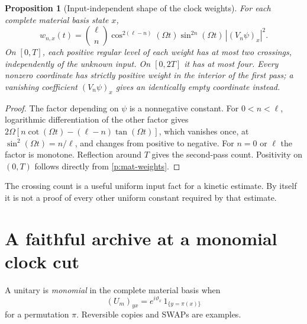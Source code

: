 \documentclass[11pt,oneside,openany]{book}
\newtheorem{proposition}[theorem]{Proposition}
\theoremstyle{definition}
\theoremstyle{remark}\newtheorem{remark}[theorem]{Remark}
\begin{document}
\begin{proposition}[Input-independent shape of the clock weights]
\label{p:mat-levels}
For each complete material basis state $x$,
\begin{equation}\label{p:mat-weights}
 w_{n,x}(t)=\binom\ell n\cos^{2(\ell-n)}(\Omega t)
             \sin^{2n}(\Omega t)\,|(V_n\psi)_x|^2.
\end{equation}
On $[0,T]$, each positive regular level of each weight has at most two
crossings, independently of the unknown input.  On $[0,2T]$ it has at
most four.  Every nonzero coordinate has strictly positive weight in
the interior of the first pass; a vanishing coefficient
$(V_n\psi)_x$ gives an identically empty coordinate instead.
\end{proposition}
\begin{proof}
The factor depending on $\psi$ is a nonnegative constant.  For
$0<n<\ell$, logarithmic differentiation of the other factor gives
$2\Omega[n\cot(\Omega t)-(\ell-n)\tan(\Omega t)]$, which vanishes
once, at $\sin^2(\Omega t)=n/\ell$, and changes from positive to
negative.  For $n=0$ or $\ell$ the factor is monotone.  Reflection
around $T$ gives the second-pass count.  Positivity on $(0,T)$ follows
directly from \eqref{p:mat-weights}.
\end{proof}
The crossing count is a useful uniform input fact for a kinetic estimate.
By itself it is not a proof of every other uniform constant required by
that estimate.

\section{A faithful archive at a monomial clock cut}

A unitary is \emph{monomial} in the complete material basis when
\begin{equation}\label{p:mat-monomial}
 (U_m)_{yx}=e^{i\vartheta_x}\,1_{\{y=\pi(x)\}}
\end{equation}
for a permutation $\pi$.  Reversible copies and SWAPs are examples.
\end{document}
